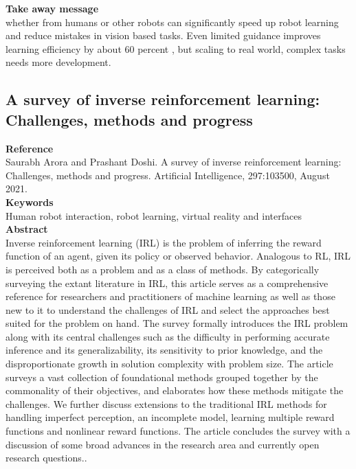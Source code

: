 \documentclass[report.tex]{subfiles}
\begin{document}
\noindent\textbf{Take away message}  \\
whether from humans or other robots  can significantly speed up robot learning and reduce mistakes in vision based tasks. Even limited guidance improves learning efficiency by about 60 percent , but scaling to real world, complex tasks needs more development.
















\subsection{A survey of inverse reinforcement learning: Challenges,
methods and progress} 

\noindent\textbf{Reference} \\
\cite{arora_survey_2021}Saurabh Arora and Prashant Doshi. A survey of inverse reinforcement learning: Challenges, methods
and progress. Artificial Intelligence, 297:103500, August 2021. \\


\noindent\textbf{Keywords} \\
Human robot interaction, robot learning, virtual reality and interfaces
   \\

\noindent\textbf{Abstract} \\
Inverse reinforcement learning (IRL) is the problem of inferring the reward function of
an agent, given its policy or observed behavior. Analogous to RL, IRL is perceived both
as a problem and as a class of methods. By categorically surveying the extant literature
in IRL, this article serves as a comprehensive reference for researchers and practitioners
of machine learning as well as those new to it to understand the challenges of IRL
and select the approaches best suited for the problem on hand. The survey formally
introduces the IRL problem along with its central challenges such as the diﬃculty in
performing accurate inference and its generalizability, its sensitivity to prior knowledge,
and the disproportionate growth in solution complexity with problem size. The article
surveys a vast collection of foundational methods grouped together by the commonality
of their objectives, and elaborates how these methods mitigate the challenges. We further
discuss extensions to the traditional IRL methods for handling imperfect perception, an
incomplete model, learning multiple reward functions and nonlinear reward functions. The
article concludes the survey with a discussion of some broad advances in the research area
and currently open research questions..\\
\end{document}
